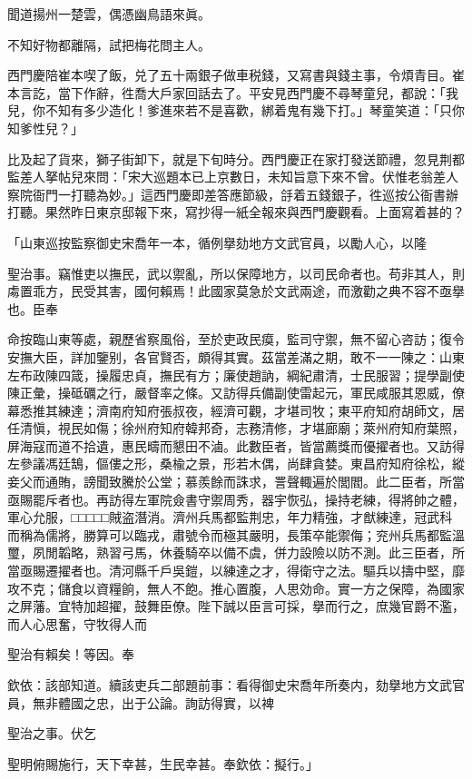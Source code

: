 \begin{myquote}
聞道揚州一楚雲，偶憑幽鳥語來眞。

不知好物都離隔，試把梅花問主人。
\end{myquote}

西門慶陪崔本喫了飯，兑了五十兩銀子做車税錢，又寫書與錢主事，令煩青目。崔本言訖，當下作辭，徃喬大戶家回話去了。平安見西門慶不尋琴童兒，都說：「我兒，你不知有多少造化！爹進來若不是喜歡，綁着鬼有幾下打。」琴童笑道：「只你知爹性兒？」

比及起了貨來，獅子街卸下，就是下旬時分。西門慶正在家打發送節禮，忽見荆都監差人拏帖兒來問：「宋大巡題本已上京數日，未知旨意下來不曾。伏惟老翁差人察院衙門一打聽為妙。」這西門慶即差答應節級，㧱着五錢銀子，徃巡按公衙書辦打聽。果然昨日東京邸報下來，寫抄得一紙全報來與西門慶觀看。上面寫着甚的？

\begin{myquote}[\markfont]
「山東巡按監察御史宋喬年一本，循例擧劾地方文武官員，以勵人心，以隆

聖治事。竊惟吏以撫民，武以禦亂，所以保障地方，以司民命者也。苟非其人，則䖏置乖方，民受其害，國何賴焉！此國家莫急於文武兩途，而激勸之典不容不亟擧也。臣奉

命按臨山東等處，親歷省察風俗，至於吏政民瘼，監司守禦，無不留心咨訪；復令安撫大臣，詳加鑒别，各官賢否，頗得其實。茲當差滿之期，敢不一一陳之：山東左布政陳四箴，操履忠貞，撫民有方；廉使趙訥，綱紀肅清，士民服習；提學副使陳正彙，操砥礪之行，嚴督率之條。又訪得兵備副使雷起元，軍民咸服其恩威，僚幕悉推其練達；濟南府知府張叔夜，經濟可觀，才堪司牧；東平府知府胡師文，居任清愼，視民如傷；徐州府知府韓邦奇，志務清修，才堪廊廟；萊州府知府葉照，屏海寇而道不拾遺，惠民疇而懇田不滷。此數臣者，皆當薦獎而優擢者也。又訪得左參議馮廷鵠，傴僂之形，桑楡之景，形若木偶，尚肆貪婪。東昌府知府徐松，縱妾父而通賄，謗聞致騰於公堂；慕羨餘而誅求，詈聲輙遍於閭閻。此二臣者，所當亟賜罷斥者也。再訪得左軍院僉書守禦周秀，器宇恢弘，操持老練，得將帥之體，軍心允服，□□□□□賊盗潛消。濟州兵馬都監荆忠，年力精強，才猷練達，冠武科而稱為儒將，勝算可以臨戎，肅號令而極其嚴明，長策卒能禦侮；兖州兵馬都監溫璽，夙閒韜略，熟習弓馬，休養騎卒以備不虞，併力設險以防不測。此三臣者，所當亟賜遷擢者也。清河縣千戶吳鎧，以練達之才，得衛守之法。驅兵以擣中堅，靡攻不克；儲食以資糧餉，無人不飽。推心置腹，人思効命。實一方之保障，為國家之屏藩。宜特加超擢，鼓舞臣僚。陛下誠以臣言可採，擧而行之，庶幾官爵不濫，而人心思奮，守牧得人而

聖治有賴矣！等因。奉

欽依：該部知道。續該吏兵二部題前事：看得御史宋喬年所奏内，劾擧地方文武官員，無非體國之忠，出于公論。詢訪得實，以裨

聖治之事。伏乞

聖明俯賜施行，天下幸甚，生民幸甚。奉欽依：擬行。」
\end{myquote}

